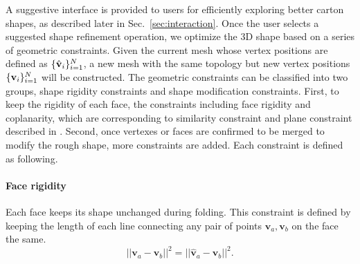 
A suggestive interface is provided to users for efficiently exploring better carton shapes, as described later in Sec.~\ref{sec:interaction}. 
%
Once the user selects a suggested shape refinement operation, we optimize the 3D shape based on a series of geometric constraints.
Given the current mesh whose vertex positions are defined as $\{\hat{\mathbf{v}}_i\}^{N}_{i=1}$, a new mesh with the same topology but new vertex positions $\{\mathbf{v}_i\}^{N}_{i=1}$ will be  constructed.
%
The geometric constraints can be classified into two groups, shape rigidity constraints and shape modification constraints.
% 
First, to keep the rigidity of each face, the constraints including face rigidity and coplanarity, which are corresponding to similarity constraint and plane constraint described in \cite{Bouaziz:2012:SSD:2346796.2346802}. 
%
Second, once vertexes or faces are confirmed to be merged to modify the rough shape, more constraints are added. 
%
Each constraint is defined as following.  



\paragraph{Face rigidity} 
Each face keeps its shape unchanged during folding. This constraint is defined by keeping the length of each line connecting any pair of points $\mathbf{v}_{a}, \mathbf{v}_{b}$ on the face the same.
\begin{equation}
||\mathbf{v}_{a} - \mathbf{v}_{b}||^2 = ||\hat{\mathbf{v}}_{a} - \hat{\mathbf{v}}_{b}||^2.
\label{equ:plane}
\end{equation}




